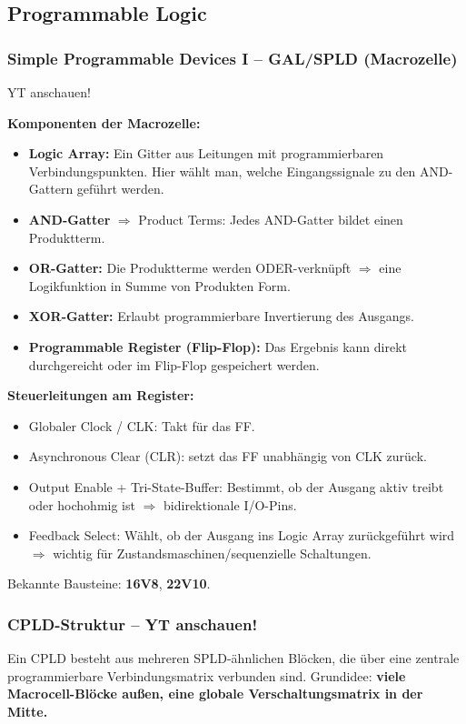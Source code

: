 \documentclass[11pt,a4paper]{article}
\begin{document}
\subsection{Programmable Logic}

\subsubsection{Simple Programmable Devices I -- GAL/SPLD (Macrozelle)}
YT anschauen!

\textbf{Komponenten der Macrozelle:}
\begin{itemize}
    \item \textbf{Logic Array:} Ein Gitter aus Leitungen mit programmierbaren Verbindungspunkten. Hier wählt man, welche Eingangssignale zu den AND-Gattern geführt werden.
    \item \textbf{AND-Gatter} $\Rightarrow$ Product Terms: Jedes AND-Gatter bildet einen Produktterm.
    \item \textbf{OR-Gatter:} Die Produktterme werden ODER-verknüpft $\Rightarrow$ eine Logikfunktion in Summe von Produkten Form.
    \item \textbf{XOR-Gatter:} Erlaubt programmierbare Invertierung des Ausgangs.
    \item \textbf{Programmable Register (Flip-Flop):} Das Ergebnis kann direkt durchgereicht oder im Flip-Flop gespeichert werden.
\end{itemize}
\textbf{Steuerleitungen am Register:}
\begin{itemize}
    \item Globaler Clock / CLK: Takt für das FF.
    \item Asynchronous Clear (CLR): setzt das FF unabhängig von CLK zurück.
    \item Output Enable + Tri-State-Buffer: Bestimmt, ob der Ausgang aktiv treibt oder hochohmig ist $\Rightarrow$ bidirektionale I/O-Pins.
    \item Feedback Select: Wählt, ob der Ausgang ins Logic Array zurückgeführt wird $\Rightarrow$ wichtig für Zustandsmaschinen/sequenzielle Schaltungen.
\end{itemize}

Bekannte Bausteine: \textbf{16V8}, \textbf{22V10}.

\subsubsection{CPLD-Struktur -- YT anschauen!}
Ein CPLD besteht aus mehreren SPLD-ähnlichen Blöcken, die über eine zentrale programmierbare Verbindungsmatrix verbunden sind. Grundidee: \textbf{viele Macrocell-Blöcke außen, eine globale Verschaltungsmatrix in der Mitte.}
\end{document}
